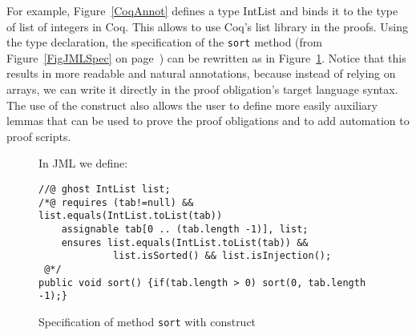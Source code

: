 For example, Figure~\ref{CoqAnnot} defines a \native type IntList and
binds it to the type of list of integers in Coq. This allows to use
Coq's list library in the proofs. Using the \native type declaration,
the specification of the {\tt sort} method (from
Figure~\ref{FigJMLSpec} on page~\pageref{FigJMLSpec}) can be rewritten
as in Figure~\ref{sortnat}. Notice that this results in more readable
and natural annotations, because instead of relying on arrays, we can
write it directly in the proof obligation's target language
syntax. The use of the \native construct also allows the user to
define more easily auxiliary lemmas that can be used to prove the
proof obligations and to add automation to proof scripts.


\begin{figure}[t!]
{\small In JML we define:
\begin{verbatim}
//@ ghost IntList list;
/*@ requires (tab!=null) && list.equals(IntList.toList(tab))
    assignable tab[0 .. (tab.length -1)], list;
    ensures list.equals(IntList.toList(tab)) &&
             list.isSorted() && list.isInjection();
 @*/
public void sort() {if(tab.length > 0) sort(0, tab.length -1);}\end{verbatim}}
\caption{Specification of method \texttt{sort} with \native construct}
\label{sortnat} 
\end{figure}




